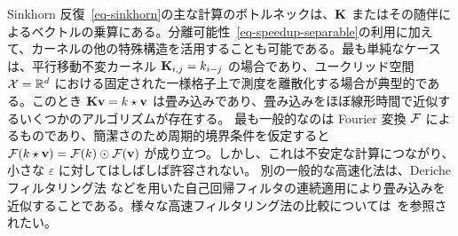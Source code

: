 \begin{rem}[近似畳み込み]\label{rem-convol-sinkh}
Sinkhorn 反復~\eqref{eq-sinkhorn}の主な計算のボトルネックは、$\mathrm{\textbf{K}}$ またはその随伴によるベクトルの乗算にある。分離可能性~\eqref{eq-speedup-separable}の利用に加えて、カーネルの他の特殊構造を活用することも可能である。最も単純なケースは、平行移動不変カーネル $\mathrm{\textbf{K}}_{i,j} = k_{i-j}$ の場合であり、ユークリッド空間 $\mathcal{X}=\mathbb{R}^d$ における固定された一様格子上で測度を離散化する場合が典型的である。このとき $\mathrm{\textbf{K}} \mathrm{\textbf{v}} = k \star \mathrm{\textbf{v}}$ は畳み込みであり、畳み込みをほぼ線形時間で近似するいくつかのアルゴリズムが存在する。
最も一般的なのは Fourier 変換 $\mathcal{F}$ によるものであり、簡潔さのため周期的境界条件を仮定すると $\mathcal{F}(k \star \mathrm{\textbf{v}})=\mathcal{F}(k) \odot \mathcal{F}(\mathrm{\textbf{v}})$ が成り立つ。しかし、これは不安定な計算につながり、小さな $\varepsilon$ に対してはしばしば許容されない。
別の一般的な高速化法は、Deriche フィルタリング法 \citet{deriche1993recursively} などを用いた自己回帰フィルタの連続適用により畳み込みを近似することである。様々な高速フィルタリング法の比較については~\citep{getreuer2013survey}を参照されたい。
\end{rem}

